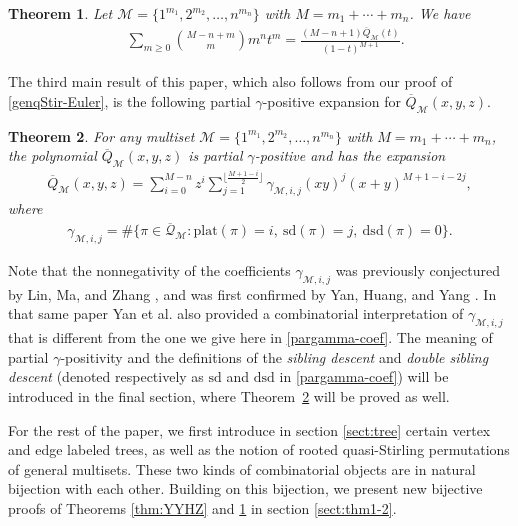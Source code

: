 \documentclass[11pt,reqno]{amsart}
\numberwithin{equation}{section}
\theoremstyle{plain}
\newtheorem{theorem}{Theorem}[section]
\theoremstyle{definition}
\newcommand{\bQ}{\overline{\mathcal{Q}}}
\newcommand{\M}{\mathcal{M}}
\def\plat{\mathrm{plat}}
\def\sdes{\mathrm{sd}}
\def\sddes{\mathrm{dsd}}
\begin{document}
\begin{theorem}\label{thm:YZ}
Let $\M=\{1^{m_1},2^{m_2},\ldots,n^{m_n}\}$ with $M=m_1+\cdots+m_n$. We have
\begin{align}
\label{numerator:genqStir}
& \sum_{m\ge 0}\binom{M-n+m}{m}m^n t^m = \frac{(M-n+1)\overline{Q}_{\M}(t)}{(1-t)^{M+1}}.
\end{align}
\end{theorem}


The third main result of this paper, which also follows from our proof of \eqref{genqStir-Euler}, is the following partial $\gamma$-positive expansion for $\overline{Q}_{\M}(x,y,z)$. 

\begin{theorem}\label{thm:pargamma}
For any multiset $\M=\{1^{m_1},2^{m_2},\ldots,n^{m_n}\}$ with $M=m_1+\cdots+m_n$, the polynomial $\overline{Q}_{\M}(x,y,z)$ is partial $\gamma$-positive and has the expansion
\begin{align}\label{pargamma of quasiStir}
\overline{Q}_{\M}(x,y,z)=\sum_{i=0}^{M-n}z^i\sum_{j=1}^{\lfloor\frac{M+1-i}{2}\rfloor}\gamma_{\M,i,j}(xy)^j(x+y)^{M+1-i-2j},
\end{align}
where
\begin{align}\label{pargamma-coef}
\gamma_{\M,i,j}=\#\{\pi\in\bQ_{\M}:\plat(\pi)=i,~\sdes(\pi)=j,~\sddes(\pi)=0\}.
\end{align}
\end{theorem}

Note that the nonnegativity of the coefficients $\gamma_{\M,i,j}$ was previously conjectured by Lin, Ma, and Zhang \cite{LMZ}, and was first confirmed by Yan, Huang, and Yang \cite{YHY}. In that same paper Yan et al. also provided a combinatorial interpretation of $\gamma_{\M,i,j}$ that is different from the one we give here in \eqref{pargamma-coef}. The meaning of partial $\gamma$-positivity and the definitions of the {\em sibling descent} and {\em double sibling descent} (denoted respectively as $\sdes$ and $\sddes$ in \eqref{pargamma-coef}) will be introduced in the final section, where Theorem~\ref{thm:pargamma} will be proved as well. 

For the rest of the paper, we first introduce in section \ref{sect:tree} certain vertex and edge labeled trees, as well as the notion of rooted quasi-Stirling permutations of general multisets. These two kinds of combinatorial objects are in natural bijection with each other. Building on this bijection, we present new bijective proofs of Theorems \ref{thm:YYHZ} and \ref{thm:YZ} in section \ref{sect:thm1-2}.
\end{document}
